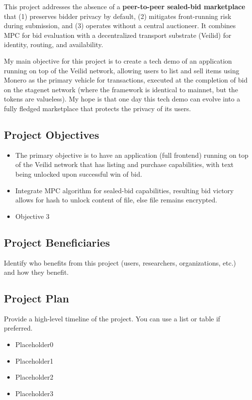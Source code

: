 \documentclass[12pt,a4paper]{article}
\begin{document}
This project addresses the absence of a \textbf{peer-to-peer sealed-bid marketplace} that (1) preserves bidder privacy by default, (2) mitigates front-running risk during submission, and (3) operates without a central auctioneer. It combines MPC for bid evaluation with a decentralized transport substrate (Veilid) for identity, routing, and availability. 

My main objective for this project is to create a tech demo of an application running on top of the Veilid network, allowing users to list and sell items using Monero as the primary vehicle for transactions, executed at the completion of bid on the stagenet network (where the framework is identical to mainnet, but the tokens are valueless). My hope is that one day this tech demo can evolve into a fully fledged marketplace that protects the privacy of its users.

\subsection{Project Objectives}
\begin{itemize}[noitemsep]
    \item The primary objective is to have an application (full frontend) running on top of the Veilid network that has listing and purchase capabilities, with text being unlocked upon successful win of bid.
    \item Integrate MPC algorithm for sealed-bid capabilities, resulting bid victory allows for hash to unlock content of file, else file remains encrypted.
    \item Objective 3
\end{itemize}

\subsection{Project Beneficiaries}
Identify who benefits from this project (users, researchers, organizations, etc.) and how they benefit.

\subsection{Project Plan}
Provide a high-level timeline of the project. You can use a list or table if preferred.

\begin{itemize}[noitemsep]
    \item Placeholder0
    \item Placeholder1
    \item Placeholder2
    \item Placeholder3
\end{itemize}
\end{document}
